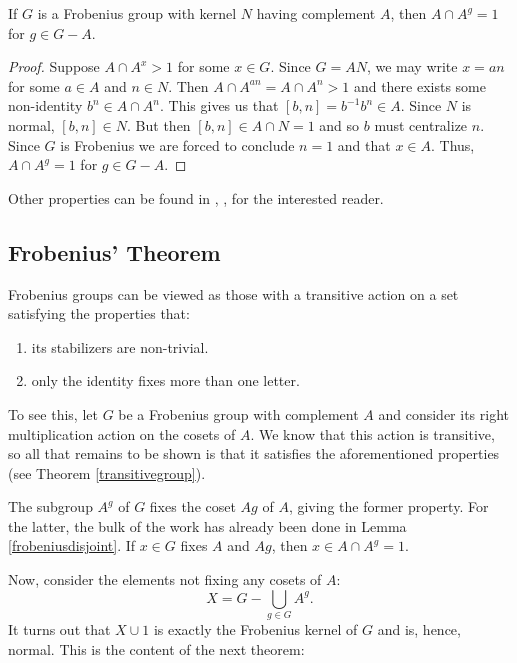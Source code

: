 \documentclass[main.tex]{subfiles}
\begin{document}
\begin{lemma}\label{frobeniusdisjoint}
If $G$ is a Frobenius group with kernel $N$ having complement $A$, then $A \cap A^g = 1$ for $g \in G - A$.
\end{lemma}

\begin{proof}
Suppose $A \cap A^x > 1$ for some $x \in G$. Since $G = AN$, we may write $x = an$ for some $a \in A$ and $n \in N$. Then $A \cap A^{an} = A \cap A^n > 1$ and there exists some non-identity $b^n \in A \cap A^n$. This gives us that $[b,n] = b^{-1}b^n \in A$. Since $N$ is normal, $[b, n] \in N$. But then $[b,n] \in A \cap N = 1$ and so $b$ must centralize $n$. Since $G$ is Frobenius we are forced to conclude $n = 1$ and that $x \in A$. Thus, $A \cap A^g = 1$ for $g \in G - A$.
\end{proof}

Other properties can be found in \cite{isaacsfinitegrouptheory}, \cite{gorensteinfinitegroups}, \cite{isaacsalgebra} for the interested reader.

\hss

\subsection{Frobenius' Theorem}

\hss

Frobenius groups can be viewed as those with a transitive action on a set satisfying the properties that:
\begin{enumerate}
	\item its stabilizers are non-trivial.
	\item only the identity fixes more than one letter.
\end{enumerate}
To see this, let $G$ be a Frobenius group with complement $A$ and consider its right multiplication action on the cosets of $A$. We know that this action is transitive, so all that remains to be shown is that it satisfies the aforementioned properties (see Theorem \ref{transitivegroup}).

The subgroup $A^g$ of $G$ fixes the coset $Ag$ of $A$, giving the former property. For the latter, the bulk of the work has already been done in Lemma \ref{frobeniusdisjoint}. If $x \in G$ fixes $A$ and $Ag$, then $x \in A \cap A^g = 1$.

Now, consider the elements not fixing any cosets of $A$:
$$X = G - \bigcup_{g \in G} A^g\text{.}$$
It turns out that $X \cup {1}$ is exactly the Frobenius kernel of $G$ and is, hence, normal. This is the content of the next theorem:
\end{document}
